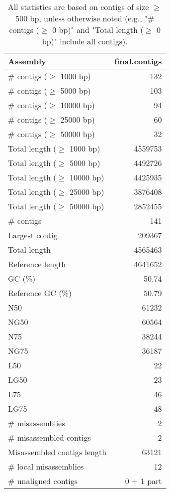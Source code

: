 \documentclass[12pt,a4paper]{article}
\begin{document}
\begin{table}[ht]
\begin{center}
\caption{All statistics are based on contigs of size $\geq$ 500 bp, unless otherwise noted (e.g., "\# contigs ($\geq$ 0 bp)" and "Total length ($\geq$ 0 bp)" include all contigs).}
\begin{tabular}{|l*{1}{|r}|}
\hline
Assembly & final.contigs \\ \hline
\# contigs ($\geq$ 1000 bp) & 132 \\ \hline
\# contigs ($\geq$ 5000 bp) & 103 \\ \hline
\# contigs ($\geq$ 10000 bp) & 94 \\ \hline
\# contigs ($\geq$ 25000 bp) & 60 \\ \hline
\# contigs ($\geq$ 50000 bp) & 32 \\ \hline
Total length ($\geq$ 1000 bp) & 4559753 \\ \hline
Total length ($\geq$ 5000 bp) & 4492726 \\ \hline
Total length ($\geq$ 10000 bp) & 4425935 \\ \hline
Total length ($\geq$ 25000 bp) & 3876408 \\ \hline
Total length ($\geq$ 50000 bp) & 2852455 \\ \hline
\# contigs & 141 \\ \hline
Largest contig & 209367 \\ \hline
Total length & 4565463 \\ \hline
Reference length & 4641652 \\ \hline
GC (\%) & 50.74 \\ \hline
Reference GC (\%) & 50.79 \\ \hline
N50 & 61232 \\ \hline
NG50 & 60564 \\ \hline
N75 & 38244 \\ \hline
NG75 & 36187 \\ \hline
L50 & 22 \\ \hline
LG50 & 23 \\ \hline
L75 & 46 \\ \hline
LG75 & 48 \\ \hline
\# misassemblies & 2 \\ \hline
\# misassembled contigs & 2 \\ \hline
Misassembled contigs length & 63121 \\ \hline
\# local misassemblies & 12 \\ \hline
\# unaligned contigs & 0 + 1 part \\ \hline

\end{tabular}
\end{center}
\end{table}
\end{document}
